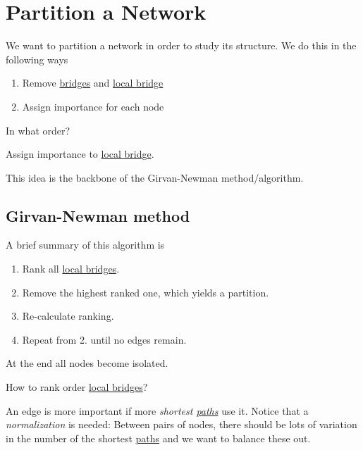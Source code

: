 \chapter{Partition a Network}
We want to partition a network in order to study its structure. We do this in the following ways
\begin{enumerate}
	\item Remove \hyperref[def:bridge]{bridges} and \hyperref[def:local-bridge]{local bridge}
	\item Assign importance for each node
\end{enumerate}

\begin{problem}
In what order?
\end{problem}
\begin{answer}
	Assign importance to \hyperref[def:local-bridge]{local bridge}.
\end{answer}

This idea is the backbone of the Girvan-Newman method/algorithm.

\section{Girvan-Newman method}
\begin{intuition}
	A brief summary of this algorithm is
	\begin{enumerate}
		\item Rank all \hyperref[def:local-bridge]{local bridges}.
		\item Remove the highest ranked one, which yields a partition.
		\item Re-calculate ranking.
		\item Repeat from 2. until no edges remain.
	\end{enumerate}
\end{intuition}

\begin{note}
	At the end all nodes become isolated.
\end{note}

\begin{problem}
How to rank order \hyperref[def:local-bridge]{local bridges}?
\end{problem}

\begin{intuition}
	An edge is more important if more \emph{shortest \hyperref[def:path]{paths}} use it. Notice that a \emph{normalization} is needed:
	Between pairs of nodes, there should be lots of variation in the number of the shortest \hyperref[def:path]{paths} and we want to balance these out.
\end{intuition}

